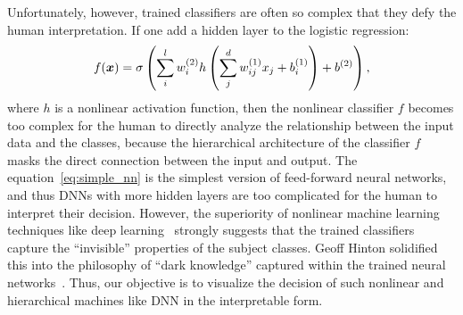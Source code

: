 %
Unfortunately, however, trained classifiers are often so complex that
they defy the human interpretation.
%
If one add a hidden layer to the logistic regression:
\begin{equation}
 \label{eq:simple_nn}
f(\mbox{\boldmath $x$}) = \sigma \left(\sum_{i}^{l} w_{i}^{(2)} h
\left(\sum_{j}^{d} w_{ij}^{(1)} x_{j} + b_{i}^{(1)}\right) +
b^{(2)}\right),
\end{equation}
where $h$ is a nonlinear activation function,
then the nonlinear classifier $f$ becomes too complex for the human to
directly analyze the relationship between the input data and the classes,
because the hierarchical architecture of the classifier $f$ masks the
direct connection between the input and output.
%
The equation~\eqref{eq:simple_nn} is the simplest version of
feed-forward neural networks, and thus DNNs with more hidden layers are
too complicated for the human to interpret their decision.
%
However, the superiority of nonlinear machine learning techniques like deep
learning~\cite{krizhevsky2012imagenet,seide2011conversational,DeepFace} strongly suggests that the trained classifiers
capture the ``invisible'' properties of the subject classes.
%
Geoff Hinton solidified this into the philosophy of
``dark knowledge'' captured within the trained neural networks~\cite{DarkKnowledge}.
%
Thus, our objective is to visualize the decision of such nonlinear and hierarchical machines like DNN
in the interpretable form.

